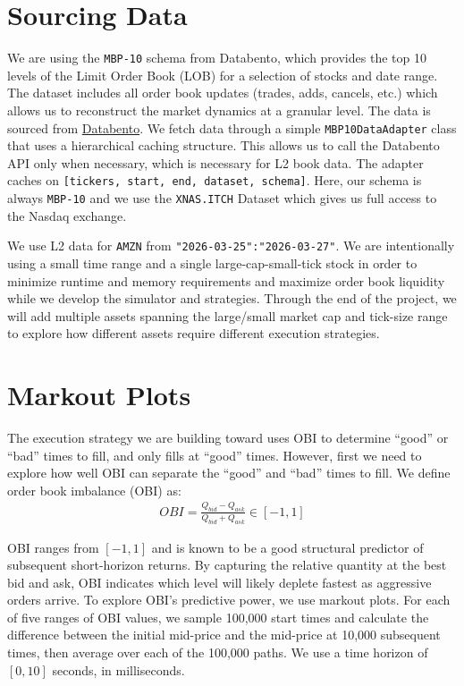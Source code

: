 \documentclass[
  letterpaper,
]{article}
\begin{document}
\section{Sourcing Data}\label{sourcing-data}

We are using the \texttt{MBP-10} schema from Databento, which provides
the top 10 levels of the Limit Order Book (LOB) for a selection of
stocks and date range. The dataset includes all order book updates
(trades, adds, cancels, etc.) which allows us to reconstruct the market
dynamics at a granular level. The data is sourced from
\href{https://databento.com/docs/schemas-and-data-formats/mbp-10?historical=python&live=python&reference=python}{Databento}.
We fetch data through a simple \texttt{MBP10DataAdapter} class that uses
a hierarchical caching structure. This allows us to call the Databento
API only when necessary, which is necessary for L2 book data. The
adapter caches on
\texttt{{[}tickers,\ start,\ end,\ dataset,\ schema{]}}. Here, our
schema is always \texttt{MBP-10} and we use the \texttt{XNAS.ITCH}
Dataset which gives us full access to the Nasdaq exchange.

We use L2 data for \texttt{AMZN} from
\texttt{"2026-03-25":"2026-03-27"}. We are intentionally using a small
time range and a single large-cap-small-tick stock in order to minimize
runtime and memory requirements and maximize order book liquidity while
we develop the simulator and strategies. Through the end of the project,
we will add multiple assets spanning the large/small market cap and
tick-size range to explore how different assets require different
execution strategies.

\section{Markout Plots}\label{markout-plots}

The execution strategy we are building toward uses OBI to determine
``good'' or ``bad'' times to fill, and only fills at ``good'' times.
However, first we need to explore how well OBI can separate the ``good''
and ``bad'' times to fill. We define order book imbalance (OBI) as: \[
\begin{split}
OBI = \frac{Q_{bid} - Q_{ask}}{Q_{bid} + Q_{ask}}\in [-1, 1]
\end{split}
\]

OBI ranges from \([-1,1]\) and is known to be a good structural
predictor of subsequent short-horizon returns. By capturing the relative
quantity at the best bid and ask, OBI indicates which level will likely
deplete fastest as aggressive orders arrive. To explore OBI's predictive
power, we use markout plots. For each of five ranges of OBI values, we
sample 100,000 start times and calculate the difference between the
initial mid-price and the mid-price at 10,000 subsequent times, then
average over each of the 100,000 paths. We use a time horizon of
\([0,10]\) seconds, in milliseconds.
\end{document}
